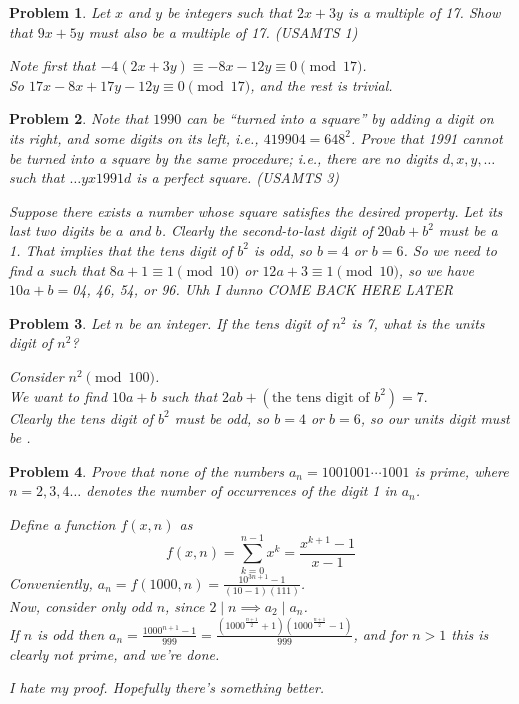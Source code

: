 \documentclass{scrartcl}
\newtheorem{a_problem}{Problem}
\begin{document}
\setcounter{a_problem}{386}
\begin{a_problem}
	Let $x$ and $y$ be integers such that $2x+3y$ is a multiple of 17. Show that $9x + 5y$ must also be a multiple of 17. (USAMTS 1)
	\begin{soln}
		Note first that $-4(2x + 3y) \equiv -8x - 12y \equiv 0 \pmod{17}$. \\
		So $17x - 8x + 17y - 12y \equiv 0 \pmod{17}$, and the rest is trivial.
	\end{soln}
\end{a_problem}

\begin{a_problem}
	Note that $1990$ can be ``turned into a square'' by adding a digit on its right, and some digits on its left, i.e., $419904=648^2$. Prove that 1991 cannot be turned into a square by the same procedure; i.e., there are no digits $d,x,y, \dots$ such that $\dots yx1991d$ is a perfect square. (USAMTS 3)
	\begin{soln}
		Suppose there exists a number whose square satisfies the desired property. Let its last two digits be $a$ and $b$.
		Clearly the second-to-last digit of $20ab + b^2$ must be a 1. That implies that the tens digit of $b^2$ is odd, so $b=4$ or $b=6$. So we need to find $a$ such that $8a + 1 \equiv 1 \pmod{10}$ or $12a + 3 \equiv 1 \pmod{10}$, so we have $10a+b = $04, 46, 54, or 96.
		Uhh I dunno COME BACK HERE LATER
	\end{soln}
\end{a_problem}

\setcounter{a_problem}{392}
\begin{a_problem}
	Let $n$ be an integer. If the tens digit of $n^2$ is 7, what is the units digit of $n^2$?
	\begin{soln}
		Consider $n^2 \pmod{100}$. \\
		We want to find $10a+b$ such that $2ab + (\text{the tens digit of $b^2$}) = 7.$ \\
		Clearly the tens digit of $b^2$ must be odd, so $b=4$ or $b=6$, so our units digit must be .
	\end{soln}
\end{a_problem}

\begin{a_problem}
	Prove that none of the numbers $a_n = 1001001\cdots1001$ is prime, where $n=2,3,4\dots$ denotes the number of occurrences of the digit 1 in $a_n$.
	\begin{soln}
		Define a function $f(x,n)$ as
		\[f(x,n) = \sum_{k=0}^{n-1}x^k = \frac{x^{k+1}-1}{x - 1} \]
			Conveniently, $a_n = f(1000,n) = \frac{10^{3n+1} - 1}{(10 - 1)(111)}$. \\
		Now, consider only odd $n$, since $2 \mid n \implies a_2 \mid a_n$. \\
		If $n$ is odd then $a_n = \frac{1000^{n+1}-1}{999} = \frac{(1000^{\frac{n+1}{2}} + 1)(1000^{\frac{n+1}2} - 1)}{999}$, and for $n>1$ this is clearly not prime, and we're done.
	\end{soln}
	\begin{remark*}
		I hate my proof. Hopefully there's something better.
	\end{remark*}
\end{a_problem}
\end{document}
